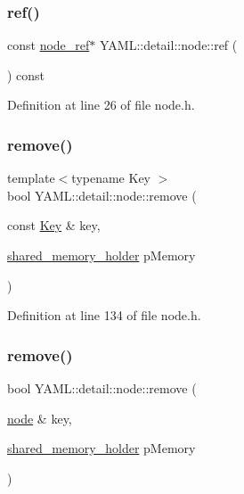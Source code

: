 \subsubsection{\texorpdfstring{ref()}{ref()}}
{\footnotesize\ttfamily const \mbox{\hyperlink{class_y_a_m_l_1_1detail_1_1node__ref}{node\+\_\+ref}}$\ast$ Y\+A\+M\+L\+::detail\+::node\+::ref (\begin{DoxyParamCaption}{ }\end{DoxyParamCaption}) const\hspace{0.3cm}{\ttfamily [inline]}}



Definition at line 26 of file node.\+h.

\mbox{\label{class_y_a_m_l_1_1detail_1_1node_a0ee08e5fa4438b6236e08e031f1fde5e}} 
\subsubsection{\texorpdfstring{remove()}{remove()}\hspace{0.1cm}{\footnotesize\ttfamily [1/2]}}
{\footnotesize\ttfamily template$<$typename Key $>$ \\
bool Y\+A\+M\+L\+::detail\+::node\+::remove (\begin{DoxyParamCaption}\item[{const \mbox{\hyperlink{namespace_y_a_m_l_a67c320aa50d3de7ecba1d0b8775dd684a1af533fc24b0311b8c4d5ac2870283aa}{Key}} \&}]{key,  }\item[{\mbox{\hyperlink{namespace_y_a_m_l_1_1detail_a228c4b3b6ba1058b474d40afc218e21d}{shared\+\_\+memory\+\_\+holder}}}]{p\+Memory }\end{DoxyParamCaption})\hspace{0.3cm}{\ttfamily [inline]}}



Definition at line 134 of file node.\+h.

\mbox{\label{class_y_a_m_l_1_1detail_1_1node_a76e13e6b6f7b6be8dc9a981da9e47b3e}} 
\subsubsection{\texorpdfstring{remove()}{remove()}\hspace{0.1cm}{\footnotesize\ttfamily [2/2]}}
{\footnotesize\ttfamily bool Y\+A\+M\+L\+::detail\+::node\+::remove (\begin{DoxyParamCaption}\item[{\mbox{\hyperlink{class_y_a_m_l_1_1detail_1_1node}{node}} \&}]{key,  }\item[{\mbox{\hyperlink{namespace_y_a_m_l_1_1detail_a228c4b3b6ba1058b474d40afc218e21d}{shared\+\_\+memory\+\_\+holder}}}]{p\+Memory }\end{DoxyParamCaption})\hspace{0.3cm}{\ttfamily [inline]}}



